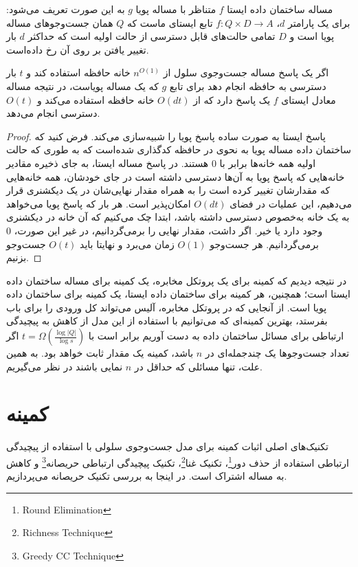 \begin{definition}
مساله ساختمان داده ایستا $f$ متناظر با مساله پویا $g$ به این صورت تعریف می‌شود: برای یک پارامتر $d$، $f: Q \times D \rightarrow A$ تابع ایستای ماست که $Q$ همان جست‌وجوهای مساله پویا است و $D$ تمامی حالت‌های قابل دسترسی از حالت اولیه است که حداکثر $d$ بار تغییر یافتن بر روی آن رخ داده‌است.
\end{definition}

\begin{theorem}
اگر یک پاسخ مساله جست‌وجوی سلول از $n^{O(1)}$ خانه حافظه استفاده کند و $t$ بار دسترسی به حافظه انجام دهد برای تابع $g$ که یک مساله پویاست، در نتیجه مساله معادل ایستای $f$ یک پاسخ دارد که از $O(dt)$ خانه حافظه استفاده می‌کند و $O(t)$ دسترسی انجام می‌دهد. 

\end{theorem}

\begin{proof}
پاسخ ایستا به صورت ساده پاسخ پویا را شبیه‌سازی می‌کند. فرض کنید که ساختمان داده مساله پویا به نحوی در حافظه کدگذاری شده‌است که به طوری که حالت اولیه همه خانه‌ها برابر با $0$ هستند. در پاسخ مساله ایستا، به جای ذخیره مقادیر خانه‌هایی که پاسخ پویا به آن‌ها دسترسی داشته است در جای خودشان، همه خانه‌هایی که مقدارشان تغییر کرده است را به همراه مقدار نهایی‌شان در یک دیکشنری قرار می‌دهیم، این عملیات در فضای $O(dt)$ امکان‌پذیر است. هر بار که پاسخ پویا می‌خواهد به یک خانه به‌خصوص دسترسی داشته باشد، ابتدا چک می‌کنیم که آن‌ خانه در دیکشنری وجود دارد یا خیر. اگر داشت، مقدار نهایی را برمی‌گردانیم، در غیر این صورت، $0$ برمی‌گردانیم. هر جست‌وجو $O(1)$ زمان می‌برد و نهایتا باید $O(t)$ جست‌وجو بزنیم. 
\end{proof}

در نتیجه دیدیم که کمینه برای یک پروتکل مخابره، یک کمینه برای مساله ساختمان داده ایستا است؛ همچنین، هر کمینه برای ساختمان داده ایستا، یک کمینه برای ساختمان داده پویا است. از آنجایی که در پروتکل مخابره، آلیس می‌تواند کل ورودی را برای باب بفرستد، بهترین کمینه‌ای که می‌توانیم با استفاده از این مدل از کاهش به پیچیدگی ارتباطی برای مسائل ساختمان داده به دست آوریم برابر است با $t = \Omega(\frac{\log |Q|}{\log s} )$ اگر تعداد جست‌وجوها یک چندجمله‌ای در $n$ باشد، کمینه یک مقدار ثابت خواهد بود. به همین علت، تنها مسائلی که حداقل در $n$ نمایی باشند در نظر می‌گیریم. 

\section{ کمینه}

تکنیک‌های اصلی اثبات کمینه برای مدل جست‌وجوی سلولی با استفاده از پیچیدگی ارتباطی استفاده از حذف دور\footnote{Round Elimination}، تکنیک غنا\footnote{Richness Technique}، تکنیک پیچیدگی ارتباطی حریصانه\footnote{Greedy CC Technique} و کاهش به مساله اشتراک است. در اینجا به بررسی  تکنیک حریصانه می‌پردازیم. \cite{Nisan98}

